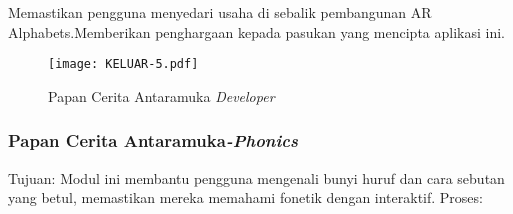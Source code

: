 Memastikan pengguna menyedari usaha di sebalik pembangunan AR Alphabets.Memberikan penghargaan kepada pasukan yang mencipta aplikasi ini.

\begin{figure}[h]
    \centering
    \texttt{[image: KELUAR-5.pdf]}
    \caption{Papan Cerita Antaramuka \textit{Developer}}
    \label{fig:Antaramuka+Developer}
\end{figure}
\vspace{15cm}






\subsubsection{Papan Cerita Antaramuka\textit{-Phonics} }
Tujuan: Modul ini membantu pengguna mengenali bunyi huruf dan cara sebutan yang betul, memastikan mereka memahami fonetik dengan interaktif. Proses:

